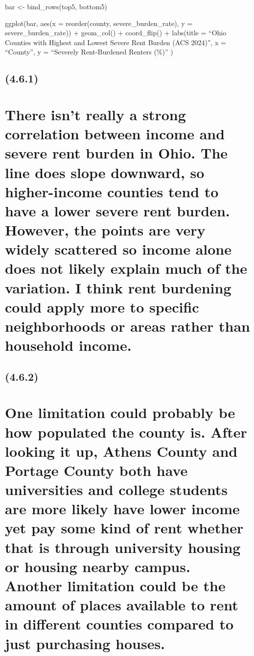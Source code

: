 \documentclass[
]{article}
\begin{document}
bar \textless- bind\_rows(top5, bottom5)

ggplot(bar, aes(x = reorder(county, severe\_burden\_rate), y =
severe\_burden\_rate)) + geom\_col() + coord\_flip() + labs(title =
``Ohio Counties with Highest and Lowest Severe Rent Burden (ACS 2024)'',
x = ``County'', y = ``Severely Rent-Burdened Renters (\%)'' )

\subsection{(4.6.1)}\label{section-14}

\section{There isn't really a strong correlation between income and
severe rent burden in Ohio. The line does slope downward, so
higher-income counties tend to have a lower severe rent burden. However,
the points are very widely scattered so income alone does not likely
explain much of the variation. I think rent burdening could apply more
to specific neighborhoods or areas rather than household
income.}\label{there-isnt-really-a-strong-correlation-between-income-and-severe-rent-burden-in-ohio.-the-line-does-slope-downward-so-higher-income-counties-tend-to-have-a-lower-severe-rent-burden.-however-the-points-are-very-widely-scattered-so-income-alone-does-not-likely-explain-much-of-the-variation.-i-think-rent-burdening-could-apply-more-to-specific-neighborhoods-or-areas-rather-than-household-income.}

\subsection{(4.6.2)}\label{section-15}

\section{One limitation could probably be how populated the county is.
After looking it up, Athens County and Portage County both have
universities and college students are more likely have lower income yet
pay some kind of rent whether that is through university housing or
housing nearby campus. Another limitation could be the amount of places
available to rent in different counties compared to just purchasing
houses.}\label{one-limitation-could-probably-be-how-populated-the-county-is.-after-looking-it-up-athens-county-and-portage-county-both-have-universities-and-college-students-are-more-likely-have-lower-income-yet-pay-some-kind-of-rent-whether-that-is-through-university-housing-or-housing-nearby-campus.-another-limitation-could-be-the-amount-of-places-available-to-rent-in-different-counties-compared-to-just-purchasing-houses.}
\end{document}
